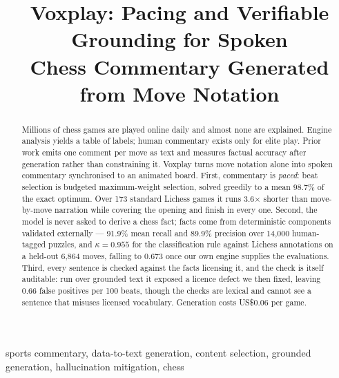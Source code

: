 \documentclass[conference]{IEEEtran}
\begin{document}
\title{Voxplay: Pacing and Verifiable Grounding for Spoken\\
Chess Commentary Generated from Move Notation}

\author{%
}

\maketitle

\begin{abstract}
Millions of chess games are played online daily and almost none are
explained. Engine analysis yields a table of labels; human commentary exists
only for elite play. Prior work emits one comment per move as text and
measures factual accuracy after generation rather than constraining it.
Voxplay turns move notation alone into spoken commentary synchronised to an
animated board. First, commentary is \emph{paced}: beat selection is
budgeted maximum-weight selection, solved greedily to a mean 98.7\% of the
exact optimum. Over 173 standard Lichess games it runs 3.6$\times$ shorter
than move-by-move narration while covering the opening and finish in every
one. Second, the model is never asked to derive a chess fact; facts come
from deterministic components validated externally --- 91.9\% mean recall
and 89.9\% precision over 14,000 human-tagged puzzles, and $\kappa = 0.955$
for the classification rule against Lichess annotations on a held-out 6,864
moves, falling to 0.673 once our own engine supplies the evaluations. Third,
every sentence is checked against the facts licensing it, and the check is
itself auditable: run over grounded text it exposed a licence defect we then
fixed, leaving 0.66 false positives per 100 beats, though the checks are
lexical and cannot see a sentence that misuses licensed vocabulary.
Generation costs US\$0.06 per game.
\end{abstract}

\begin{IEEEkeywords}
sports commentary, data-to-text generation, content selection, grounded
generation, hallucination mitigation, chess
\end{IEEEkeywords}

\end{document}
